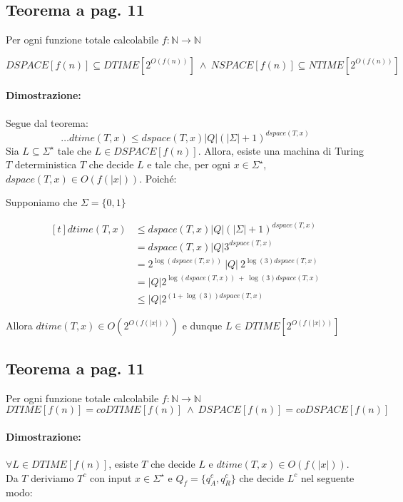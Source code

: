 \subsection{Teorema a pag. 11}

Per ogni funzione totale calcolabile $f: \mathbb{N} \rightarrow \mathbb{N}$ 

$$DSPACE[f(n)] \subseteq DTIME[2^{O(f(n))}]\ \land\ NSPACE[f(n)] \subseteq NTIME[2^{O(f(n))}]$$

\paragraph*{Dimostrazione:} Segue dal teorema:
$$\dots dtime(T, x) \leq dspace(T, x)|Q|(|\Sigma| + 1)^{dspace(T, x)}$$
Sia $L \subseteq \Sigma^{\star}$ tale che $L \in DSPACE[f(n)]$. Allora, esiste una machina di Turing $T$ deterministica $T$
che decide $L$ e tale che, per ogni $x \in \Sigma^{\star}$, $dspace(T, x) \in O(f(|x|))$. Poiché:

Supponiamo che $\Sigma = \{0, 1\}$

\[
    \begin{aligned}[t]
    dtime(T, x) &\leq dspace(T, x)|Q|(|\Sigma| + 1)^{dspace(T, x)} \\
                 &= dspace(T, x)|Q|3^{dspace(T, x)}\\
                 &= 2^{\log(dspace(T,x))}\ |Q|\ 2^{\log(3)dspace(T, x)}\\
                 &= |Q|2^{\log(dspace(T,x))\ +\ \log(3)dspace(T, x)}\\
                 &\leq |Q|2^{(1 + \log(3))dspace(T, x)}
    \end{aligned}
\]

Allora $dtime(T, x)\in O(2^{O(f(|x|))})$ e dunque $L\in DTIME[2^{O(f(|x|))}]$

\subsection{Teorema a pag. 11}

Per ogni funzione totale calcolabile $f: \mathbb{N} \rightarrow \mathbb{N}$ 
$$DTIME[f(n)] = coDTIME[f(n)]\ \land\ DSPACE[f(n)] = coDSPACE[f(n)]$$

\paragraph*{Dimostrazione:} $\forall L \in DTIME[f(n)]$, esiste $T$ che decide $L$ e $dtime(T, x) \in O(f(|x|))$. 
Da $T$ deriviamo $T^{c}$ con input $x \in \Sigma^{\star}$ e $Q_{f} = \{q_{A}^{c}, q_{R}^{c}\}$ che decide $L^{c}$ nel seguente modo:

